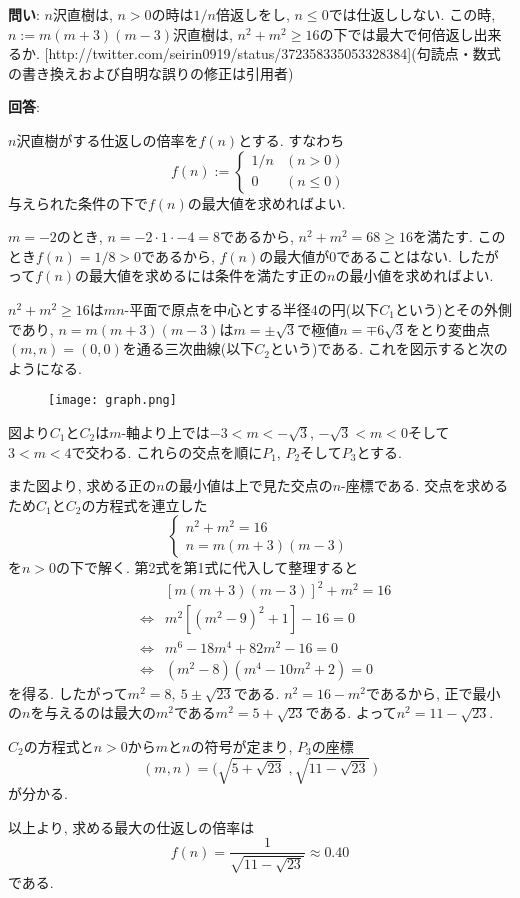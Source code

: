 \documentclass[11pt,a4paper,twocolumn]{jsarticle}
\begin{document}
{\bf 問い}: $n$沢直樹は, $n>0$の時は$1/n$倍返しをし, $n \le 0$では仕返ししない. この時, $n := m(m+3)(m-3)$沢直樹は, $n^2+m^2 \ge 16$の下では最大で何倍返し出来るか. [http://\allowbreak{}twitter.com/seirin0919/status/372358335053\allowbreak{}328384](句読点・数式の書き換えおよび自明な誤りの修正は引用者)

\bigskip

{\bf 回答}:

\smallskip
\noindent $n$沢直樹がする仕返しの倍率を$f(n)$とする.
すなわち
\[ f(n) := \begin{cases}
  1 / n & (n > 0) \\
  0 & (n \le 0)
\end{cases} \]
与えられた条件の下で$f(n)$の最大値を求めればよい.

$m = -2$のとき, $n = -2 \cdot 1 \cdot -4 = 8$であるから, $n^2 + m^2 = 68 \ge 16$を満たす.
このとき$f(n) = 1/8 > 0$であるから, $f(n)$の最大値が$0$であることはない.
したがって$f(n)$の最大値を求めるには条件を満たす正の$n$の最小値を求めればよい.

$n^2 + m^2 \ge 16$は$mn$-平面で原点を中心とする半径$4$の円(以下$C_1$という)とその外側であり,
$n = m(m+3)(m-3)$は$m = \pm \sqrt 3$で極値$n = \mp 6 \sqrt 3$をとり変曲点$(m, n) = (0, 0)$を通る三次曲線(以下$C_2$という)である.
これを図示すると次のようになる.
\begin{figure}[h]
  \begin{center}
    \texttt{[image: graph.png]}
  \end{center}
\end{figure}

図より$C_1$と$C_2$は$m$-軸より上では$-3 < m < - \sqrt 3$, $- \sqrt 3 < m < 0$そして$3 < m < 4$で交わる.
これらの交点を順に$P_1$, $P_2$そして$P_3$とする.

また図より, 求める正の$n$の最小値は上で見た交点の$n$-座標である.
交点を求めるため$C_1$と$C_2$の方程式を連立した
\[ \begin{cases}
  n^2 + m^2 = 16 \\
  n = m(m+3)(m-3)
\end{cases} \]
を$n > 0$の下で解く.
第2式を第1式に代入して整理すると
\begin{eqnarray*}
  && [m(m+3)(m-3)]^2 + m^2 = 16 \\
  & \Leftrightarrow & m^2[(m^2 - 9)^2 + 1] - 16 = 0 \\
  & \Leftrightarrow & m^6 - 18m^4 + 82m^2 - 16 = 0 \\
  & \Leftrightarrow & (m^2 - 8)(m^4 - 10m^2 + 2) = 0
\end{eqnarray*}
を得る.
したがって$m^2 = 8, \ 5 \pm \sqrt{23}$である.
$n^2 = 16 - m^2$であるから, 正で最小の$n$を与えるのは最大の$m^2$である$m^2 = 5 + \sqrt{23}$である.
よって$n^2 = 11 - \sqrt{23}$.

$C_2$の方程式と$n > 0$から$m$と$n$の符号が定まり, $P_3$の座標
\[ (m, n) = \biggl( \sqrt{5 + \sqrt{23}} \ , \sqrt{11 - \sqrt{23}} \ \biggr) \]
が分かる.

以上より, 求める最大の仕返しの倍率は
\[ f(n) = \frac{1}{\sqrt{11 - \sqrt{23}}} \approx 0.40 \]
である.
\end{document}
